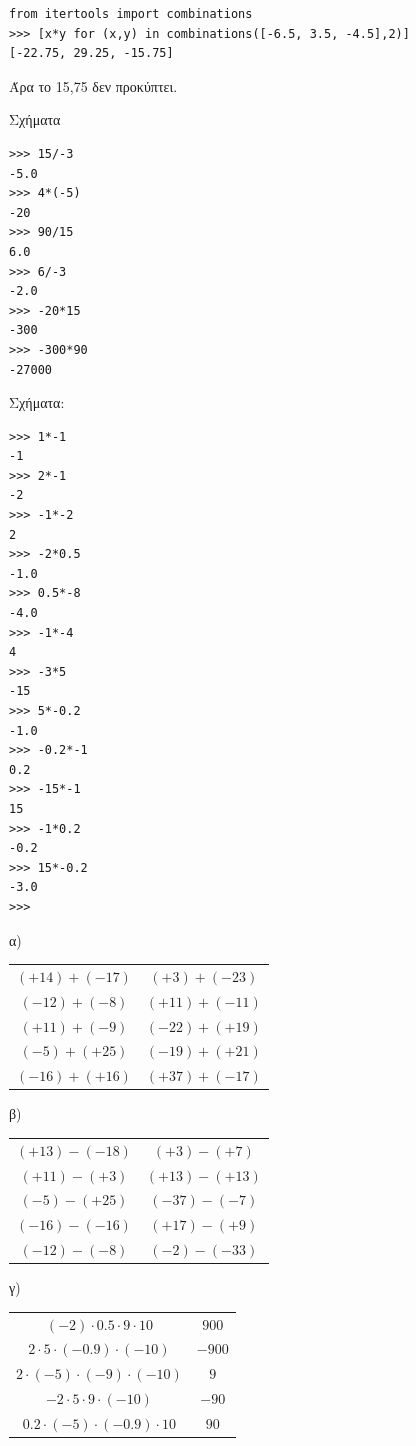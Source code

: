 \begin{lstlisting}
from itertools import combinations
>>> [x*y for (x,y) in combinations([-6.5, 3.5, -4.5],2)]
[-22.75, 29.25, -15.75]
\end{lstlisting}
Άρα το 15,75 δεν προκύπτει.
\begin{exercise}
Σχήματα
\end{exercise}
\begin{lstlisting}
>>> 15/-3
-5.0
>>> 4*(-5)
-20
>>> 90/15
6.0
>>> 6/-3
-2.0
>>> -20*15
-300
>>> -300*90
-27000
\end{lstlisting}
\begin{exercise}
Σχήματα:
\end{exercise}
\begin{lstlisting}
>>> 1*-1
-1
>>> 2*-1
-2
>>> -1*-2
2
>>> -2*0.5
-1.0
>>> 0.5*-8
-4.0
>>> -1*-4
4
>>> -3*5
-15
>>> 5*-0.2
-1.0
>>> -0.2*-1
0.2
>>> -15*-1
15
>>> -1*0.2
-0.2
>>> 15*-0.2
-3.0
>>>
\end{lstlisting}
\begin{exercise}
α)
\begin{table}[ht]
\begin{tabular}{cc}
$(+14)+(-17)$&$(+3)+(-23)$\\
$(-12)+(-8) $&$(+11)+(-11)$\\
$(+11)+(-9) $&$(-22)+(+19)$\\
$(-5)+(+25) $&$(-19)+(+21)$\\
$(-16)+(+16)$&$(+37)+(-17)$\\
\end{tabular}
\end{table}

β)
\begin{table}[ht]
\begin{tabular}{cc}
$(+13)-(-18)$&$(+3)-(+7)$\\
$(+11)-(+3) $&$(+13)-(+13)$\\
$(-5)-(+25) $&$(-37)-(-7)$\\
$(-16)-(-16)$&$(+17)-(+9)$\\
$(-12)-(-8) $&$(-2)-(-33)$\\
\end{tabular}
\end{table}

γ)
\begin{table}[ht]
\begin{tabular}{cc}
$(-2)\cdot 0.5\cdot 9\cdot 10      $&$900$\\
$2\cdot 5\cdot (-0.9)\cdot (-10)   $&$-900$\\
$2\cdot (-5)\cdot (-9)\cdot (-10)  $&$9$\\
$-2\cdot 5\cdot 9\cdot (-10)       $&$-90$\\
$0.2\cdot (-5)\cdot (-0.9)\cdot 10 $&$90$\\
\end{tabular}
\end{table}
\end{exercise}
